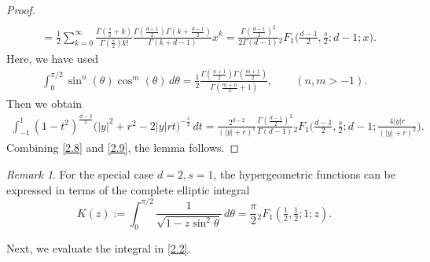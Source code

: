 \documentclass[10pt]{amsart}
\theoremstyle{plain}
\theoremstyle{remark}
\newtheorem{rem}{Remark}
\numberwithin{equation}{section}
\begin{document}
\begin{proof}
\begin{align*}
 \\
 &= \frac12 \sum_{k=0}^\infty \frac{ \Gamma(\frac{s}{2}+k) }{ \Gamma(\frac{s}{2}) k! }  \frac{ \Gamma( \frac{d-1}{2}  ) \Gamma( k+\frac{d-1}{2} ) }{  \Gamma(k+d-1)  } x^k  = \frac{ \Gamma( \frac{d-1}{2} )^2 }{ 2\Gamma(d-1) } {}_2F_1\Big( \frac{d-1}{2}, \frac{s}{2}; d-1; x\Big). 
\end{align*}
Here, we have used  
\begin{align*}
\int_0^{\pi/2} \sin^n(\theta) \cos^m(\theta)\,d\theta = \frac12 \frac{ \Gamma(\frac{n+1}{2}) \Gamma(\frac{m+1}{2} ) }{ \Gamma( \frac{m+n}{2}+1 ) }, \qquad (n,m>-1).  
\end{align*} 
Then we obtain  
\begin{align} \label{2.9}
 \int_{-1}^1   (1-t^2)^{ \frac{d-3}{2} } \Big( |y|^2+r^2-2|y|r t \Big)^{ -\frac{s}{2} }   \,dt  =  \frac{ 2^{d-2} }{ (|y|+r)^s }    \frac{ \Gamma( \frac{d-1}{2} )^2 }{  \Gamma(d-1) } {}_2F_1\Big( \frac{d-1}{2}, \frac{s}{2}; d-1;  \frac{4|y|r}{ (|y|+r)^2 }\Big).  
\end{align}
Combining \eqref{2.8} and \eqref{2.9}, the lemma follows. 
\end{proof}


\begin{rem} 
For the special case $d=2,s=1$, the hypergeometric functions can be expressed 
in terms of the complete elliptic integral
\begin{equation}
K(z) := \int_0^{\pi/2} \frac{1}{ \sqrt{ 1-z \sin^2\theta } } \,d\theta = \frac{\pi}{2} {}_2F_1( \tfrac12, \tfrac12; 1; z ). 
\end{equation} 
\end{rem}

Next, we evaluate the integral in \eqref{2.2}. 

 
\end{document}
